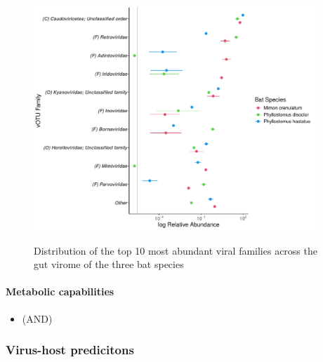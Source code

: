 \documentclass[
]{article}
\providecommand{\tightlist}{%
  \setlength{\itemsep}{0pt}\setlength{\parskip}{0pt}}
\begin{document}
\begin{figure}
\includegraphics[width=400px,height=350px]{../../data/results/figures/FigX_top10_most_abun_viral_taxa} \caption{Distribution of the top 10 most abundant viral families across the gut virome of the three bat species}\label{fig:FigY}
\end{figure}

\paragraph{Metabolic capabilities}\label{metabolic-capabilities}

\begin{itemize}
\tightlist
\item
  (AND)
\end{itemize}

\subsubsection{Virus-host predicitons}\label{virus-host-predicitons}
\end{document}
